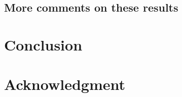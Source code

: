 \subsection{More comments on these results}
\label{subsec:results_comments}


\section{Conclusion}


\section*{Acknowledgment}



\label{sec:appendix}






%

